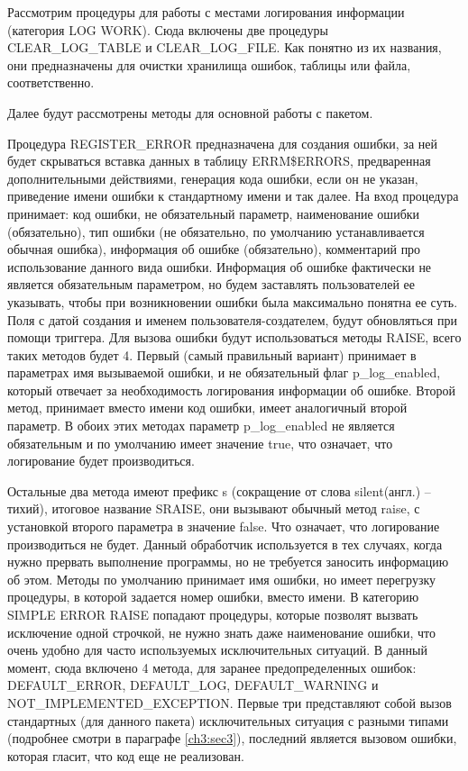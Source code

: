Рассмотрим процедуры для работы с местами логирования информации (категория LOG WORK). Сюда включены две процедуры CLEAR\_LOG\_TABLE и CLEAR\_LOG\_FILE. Как понятно из их названия, они предназначены для очистки хранилища ошибок, таблицы или файла, соответственно. 

Далее будут рассмотрены методы для основной работы с пакетом. 

Процедура REGISTER\_ERROR предназначена для создания ошибки, за ней будет скрываться вставка данных в таблицу ERRM\$ERRORS, предваренная дополнительными действиями, генерация кода ошибки, если он не указан, приведение имени ошибки к стандартному имени и так далее. На вход процедура принимает: код ошибки, не обязательный параметр, наименование ошибки (обязательно), тип ошибки (не обязательно, по умолчанию устанавливается обычная ошибка), информация об ошибке (обязательно), комментарий про использование данного вида ошибки. Информация об ошибке фактически не является обязательным параметром, но будем заставлять пользователей ее указывать, чтобы при возникновении ошибки была максимально понятна ее суть. Поля с датой создания и именем пользователя-создателем, будут обновляться при помощи триггера. 
Для вызова ошибки будут использоваться методы RAISE, всего таких методов будет 4. Первый (самый правильный вариант) принимает в параметрах имя вызываемой ошибки, и не обязательный флаг p\_log\_enabled, который отвечает за необходимость логирования информации об ошибке. Второй метод, принимает вместо имени код ошибки, имеет аналогичный второй параметр. В обоих этих методах параметр p\_log\_enabled не является обязательным и по умолчанию имеет значение true, что означает, что логирование будет производиться. 

Остальные два метода имеют префикс s (сокращение от слова silent(англ.) – тихий), итоговое название SRAISE, они вызывают обычный метод raise, с установкой второго параметра в значение false. Что означает, что логирование производиться не будет. Данный обработчик используется в тех случаях, когда нужно прервать выполнение программы, но не требуется заносить информацию об этом. Методы по умолчанию принимает имя ошибки, но имеет перегрузку процедуры, в которой задается номер ошибки, вместо имени. 
В категорию SIMPLE ERROR RAISE попадают процедуры, которые позволят вызвать исключение одной строчкой, не нужно знать даже наименование ошибки, что очень удобно для часто используемых исключительных ситуаций. В данный момент, сюда включено 4 метода, для заранее предопределенных ошибок: DEFAULT\_ERROR, DEFAULT\_LOG, DEFAULT\_WARNING и NOT\_IMPLEMENTED\_EXCEPTION. Первые три представляют собой вызов стандартных (для данного пакета) исключительных ситуация с разными типами (подробнее смотри в параграфе \ref{ch3:sec3}), последний является вызовом ошибки, которая гласит, что код еще не реализован. 

